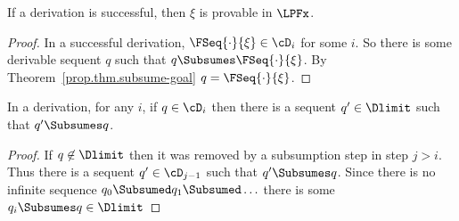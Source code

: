 
\begin{corollary}[Soundness]
  \label{prop.thm.lpfs-sound}
  If a derivation is successful, then $\xi$ is provable in $\LPFx$.
\end{corollary}

\begin{proof}
  In a successful derivation, $\FSeq{\cdot}{\xi}\in\cD_i$ for some $i$.
  So there is some derivable sequent $q$ such that
  $q\Subsumes\FSeq{\cdot}{\xi}$.
  By Theorem~\ref{prop.thm.subsume-goal}
  $q = \FSeq{\cdot}{\xi}$.
\end{proof}

\begin{lemma}
  \label{prop.thm.limit1}
  In a derivation, for any $i$, if $q\in\cD_i$ then there is a sequent
  $q'\in\Dlimit$ such that $q'\Subsumes q$.
\end{lemma}
\begin{proof}
  If $q\not\in\Dlimit$ then it was removed by a subsumption step in
  step $j>i$.  Thus there is a sequent $q'\in\cD_{j-1}$ such that $q'\Subsumes q$.
  Since there is no infinite sequence $q_0\Subsumed q_1\Subsumed \ldots$ there
  is some $q_i\Subsumes q\in\Dlimit$
\end{proof}

